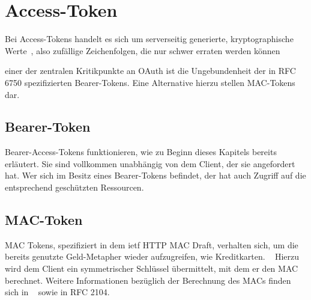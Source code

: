 \section{Access-Token}\label{accessTokens}
Bei Access-Tokens handelt es sich um serverseitig generierte,
kryptographische Werte~, also zufällige
Zeichenfolgen, die nur schwer erraten werden
können~

einer der zentralen Kritikpunkte an \gls{OAuth} ist die Ungebundenheit der in
RFC 6750 spezifizierten Bearer-Tokens. Eine Alternative hierzu stellen
MAC-Tokens dar.

\subsection{Bearer-Token} Bearer-Access-Tokens funktionieren, wie zu Beginn
dieses Kapitels bereits erläutert. Sie sind vollkommen unabhängig von dem
Client, der sie angefordert hat. Wer sich im Besitz eines Bearer-Tokens
befindet, der hat auch Zugriff auf die entsprechend geschützten Ressourcen.

\subsection{MAC-Token}\label{ssec: MAC Token}
MAC Tokens, spezifiziert in dem \gls{ietf} HTTP MAC Draft, verhalten sich, um
die bereits genutzte Geld-Metapher wieder aufzugreifen, wie Kreditkarten.
~ Hierzu wird dem Client ein symmetrischer
Schlüssel übermittelt, mit dem er den MAC berechnet. 
Weitere Informationen bezüglich der Berechnung des MACs finden sich in
~\cite[S.~136ff.]{Siriwardena.2014} sowie in RFC 2104.
